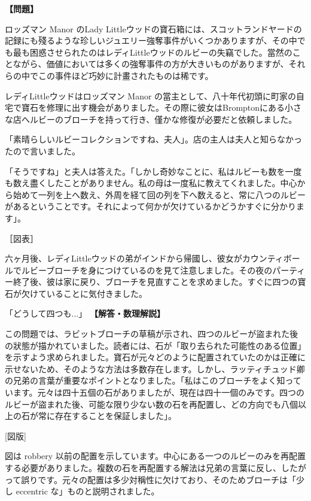 \documentclass[10pt,a4paper,oneside,openany]{ltjsbook}
\begin{document}
\begin{tcolorbox}[colback=softblue,colframe=primaryblue,title=\textbf{第 423 問：ルビーのブローチ （原題: THE RUBY BROOCH.）},arc=2mm,boxrule=1pt,breakable]
\textbf{【問題】}\par\vspace{0.3em}
ロッズマン Manor のLady Littleウッドの寶石箱には、スコットランドヤードの記録にも殘るような珍しいジュエリー強奪事件がいくつかありますが、その中でも最も困惑させられたのはレディLittleウッドのルビーの失竊でした。當然のことながら、価値においては多くの強奪事件の方が大きいものがありますが、それらの中でこの事件ほど巧妙に計畫されたものは稀です。

レディLittleウッドはロッズマン Manor の當主として、八十年代初頭に町家の自宅で寶石を修理に出す機会がありました。その際に彼女はBromptonにある小さな店へルビーのブローチを持って行き、僅かな修復が必要だと依頼しました。

「素晴らしいルビーコレクションですね、夫人」。店の主人は夫人と知らなかったので言いました。

「そうですね」と夫人は答えた。「しかし奇妙なことに、私はルビーも数を一度も数え盡くしたことがありません。私の母は一度私に教えてくれました。中心から始めて一列を上へ数え、外周を経て回の列を下へ数えると、常に八つのルビーがあるということです。それによって何かが欠けているかどうかすぐに分かります」。

［図表］

六ヶ月後、レディLittleウッドの弟がインドから帰國し、彼女がカウンティボールでルビーブローチを身につけているのを見て注意しました。その夜のパーティー終了後、彼は家に戻り、ブローチを見直すことを求めました。すぐに四つの寶石が欠けていることに気付きました。

「どうして四つも...」
\tcblower
\textbf{【解答・数理解説】}\par\vspace{0.3em}
この問題では、ラビットブローチの草稿が示され、四つのルビーが盜まれた後の狀態が描かれていました。読者には、石が「取り去られた可能性のある位置」を示すよう求められました。寶石が元々どのように配置されていたのかは正確に示せないため、そのような方法は多数存在します。しかし、ラッティチュッド卿の兄弟の言葉が重要なポイントとなりました。「私はこのブローチをよく知っています。元々は四十五個の石がありましたが、現在は四十一個のみです。四つのルビーが盜まれた後、可能な限り少ない数の石を再配置し、どの方向でも八個以上の石が常に存在することを保証しました」。

[図版]

図は robbery 以前の配置を示しています。中心にある一つのルビーのみを再配置する必要がありました。複数の石を再配置する解法は兄弟の言葉に反し、したがって誤りです。元々の配置は多少対稱性に欠けており、そのためブローチは「少し eccentric な」ものと説明されました。
\end{tcolorbox}
\end{document}

